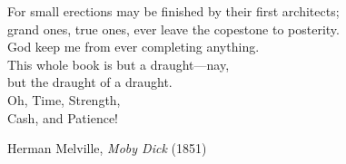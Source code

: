 
\vfill
\epigraph{For small erections may be finished by their first architects;\\
  grand ones, true ones, ever leave the copestone to posterity.\\
  God keep me from ever completing anything.\\
  This whole book is but a draught---nay,\\
  but the draught of a draught.\\
  Oh, Time, Strength,\\
  Cash, and Patience!}%
{Herman Melville, \textit{Moby Dick} (1851)}